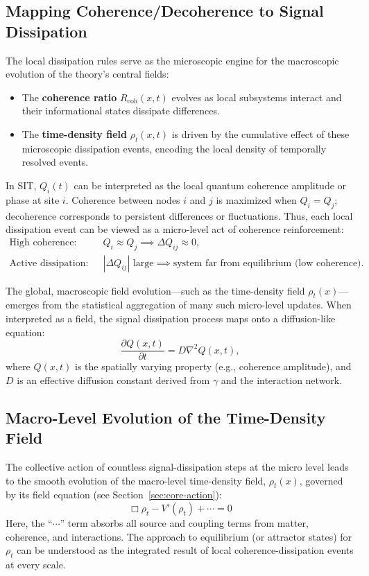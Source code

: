 \subsection{Mapping Coherence/Decoherence to Signal Dissipation}

The local dissipation rules serve as the microscopic engine for the macroscopic evolution of the theory's central fields:
\begin{itemize}
    \item The \textbf{coherence ratio} $R_{\mathrm{coh}}(x,t)$ evolves as local subsystems interact and their informational states dissipate differences.
\item The \textbf{time-density field} $\rho_t(x,t)$ is driven by the cumulative effect of these microscopic dissipation events, encoding the local density of temporally resolved events.
\end{itemize}

In SIT, $Q_i(t)$ can be interpreted as the local quantum coherence amplitude or phase at site $i$.
Coherence between nodes $i$ and $j$ is maximized when $Q_i = Q_j$; decoherence corresponds to persistent differences or fluctuations.
Thus, each local dissipation event can be viewed as a micro-level act of coherence reinforcement:
\begin{align}
\text{High coherence:}\quad & Q_i \approx Q_j \implies \Delta Q_{ij} \approx 0,\\
\text{Active dissipation:}\quad & |\Delta Q_{ij}| \text{ large} \implies \text{system far from equilibrium (low coherence)}.
\end{align}

The global, macroscopic field evolution---such as the time-density field $\rho_t(x)$---emerges from the statistical aggregation of many such micro-level updates.
When interpreted as a field, the signal dissipation process maps onto a diffusion-like equation:
\begin{equation}
\frac{\partial Q(x,t)}{\partial t} = D \nabla^2 Q(x,t),
\label{eq:dissipation}
\end{equation}
where $Q(x,t)$ is the spatially varying property (e.g., coherence amplitude), and $D$ is an effective diffusion constant derived from $\gamma$ and the interaction network.
\subsection{Macro-Level Evolution of the Time-Density Field}

The collective action of countless signal-dissipation steps at the micro level leads to the smooth evolution of the macro-level time-density field, $\rho_t(x)$, governed by its field equation (see Section~\ref{sec:core-action}):
\[
\Box \rho_t - V'(\rho_t) + \cdots = 0
\]
Here, the ``$\cdots$'' term absorbs all source and coupling terms from matter, coherence, and interactions.
The approach to equilibrium (or attractor states) for $\rho_t$ can be understood as the integrated result of local coherence-dissipation events at every scale.
